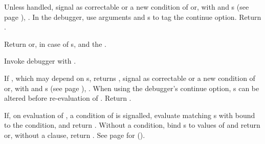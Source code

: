 \begin{LIST}{1cm}
  {
  Unless handled, signal as correctable   or
  a new condition of  or, with   and
  s (see page \pageref{section:Format}),
  . In the debugger, use  arguments
   and s to tag the continue
  option. Return \retval{\NIL}.
  }

  {
  Return  or, in case of s,
  \retval{\NIL} and the .
  }

  {
  Invoke debugger with .
  }

  {
    If , which may depend on s, returns \NIL,
    signal as correctable   or a new condition
    of  or, with   and s (see
    page \pageref{section:Format}), . When using the
    debugger's continue option, s can be altered before
    re-evaluation of . Return \retval{\NIL}. 
  }

  {
    If, on evaluation of , a condition of  is
    signalled, evaluate matching s with 
    bound to the condition, and return . Without
    a condition, bind s to values of  and
    return  or, without a
     clause, return . See
    page \pageref{section:Functions} for ().
  }


\end{LIST}
